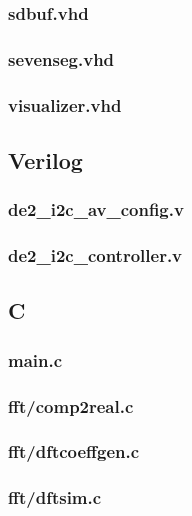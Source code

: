 \documentclass{article}
\begin{document}
	\subsubsection{sdbuf.vhd}
	
	\subsubsection{sevenseg.vhd}
	
	\subsubsection{visualizer.vhd}
	

\subsection{Verilog}
	\subsubsection{de2\_i2c\_av\_config.v}
	
	\subsubsection{de2\_i2c\_controller.v}
	

\subsection{C}
	\subsubsection{main.c}
	
	\subsubsection{fft/comp2real.c}
	
	\subsubsection{fft/dftcoeffgen.c}
	
	\subsubsection{fft/dftsim.c}
	
\end{document}
